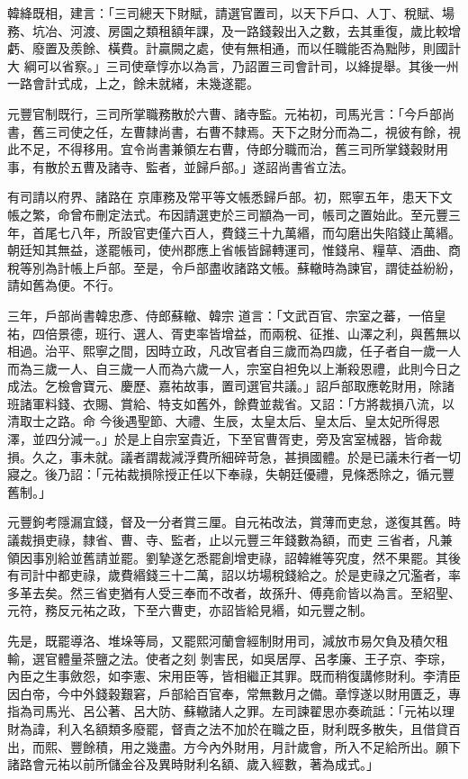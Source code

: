 \begin{pinyinscope}
 韓絳既相，建言：「三司總天下財賦，請選官置司，以天下戶口、人丁、稅賦、場務、坑冶、河渡、房園之類租額年課，及一路錢穀出入之數，去其重復，歲比較增虧、廢置及羨餘、橫費。計贏闕之處，使有無相通，而以任職能否為黜陟，則國計大
 綱可以省察。」三司使章惇亦以為言，乃詔置三司會計司，以絳提舉。其後一州一路會計式成，上之，餘未就緒，未幾遂罷。



 元豐官制既行，三司所掌職務散於六曹、諸寺監。元祐初，司馬光言：「今戶部尚書，舊三司使之任，左曹隸尚書，右曹不隸焉。天下之財分而為二，視彼有餘，視此不足，不得移用。宜令尚書兼領左右曹，侍郎分職而治，舊三司所掌錢穀財用事，有散於五曹及諸寺、監者，並歸戶部。」遂詔尚書省立法。



 有司請以府界、諸路在
 京庫務及常平等文帳悉歸戶部。初，熙寧五年，患天下文帳之繁，命曾布刪定法式。布因請選吏於三司顓為一司，帳司之置始此。至元豐三年，首尾七八年，所設官吏僅六百人，費錢三十九萬緡，而勾磨出失陷錢止萬緡。朝廷知其無益，遂罷帳司，使州郡應上省帳皆歸轉運司，惟錢帛、糧草、酒曲、商稅等別為計帳上戶部。至是，令戶部盡收諸路文帳。蘇轍時為諫官，謂徒益紛紛，請如舊為便。不行。



 三年，戶部尚書韓忠彥、侍郎蘇轍、韓宗
 道言：「文武百官、宗室之蕃，一倍皇祐，四倍景德，班行、選人、胥吏率皆增益，而兩稅、征推、山澤之利，與舊無以相過。治平、熙寧之間，因時立政，凡改官者自三歲而為四歲，任子者自一歲一人而為三歲一人、自三歲一人而為六歲一人，宗室自袒免以上漸殺恩禮，此則今日之成法。乞檢會寶元、慶歷、嘉祐故事，置司選官共議。」詔戶部取應乾財用，除諸班諸軍料錢、衣賜、賞給、特支如舊外，餘費並裁省。又詔：「方將裁損八流，以清取士之路。命
 今後遇聖節、大禮、生辰，太皇太后、皇太后、皇太妃所得恩澤，並四分減一。」於是上自宗室貴近，下至官曹胥吏，旁及宮室械器，皆命裁損。久之，事未就。議者謂裁減浮費所細碎苛急，甚損國體。於是已議未行者一切寢之。後乃詔：「元祐裁損除授正任以下奉祿，失朝廷優禮，見條悉除之，循元豐舊制。」



 元豐鉤考隱漏宜錢，督及一分者賞三厘。自元祐改法，賞薄而吏怠，遂復其舊。時議裁損吏祿，隸省、曹、寺、監者，止以元豐三年錢數為額，而吏
 三省者，凡兼領因事別給並舊請並罷。劉摯遂乞悉罷創增吏祿，詔韓維等究度，然不果罷。其後有司計中都吏祿，歲費緡錢三十二萬，詔以坊場稅錢給之。於是吏祿之冗濫者，率多革去矣。然三省吏猶有人受三奉而不改者，故孫升、傅堯俞皆以為言。至紹聖、元符，務反元祐之政，下至六曹吏，亦詔皆給見緡，如元豐之制。



 先是，既罷導洛、堆垛等局，又罷熙河蘭會經制財用司，減放市易欠負及積欠租輸，選官體量茶鹽之法。使者之刻
 剝害民，如吳居厚、呂孝廉、王子京、李琮，內臣之生事斂怨，如李憲、宋用臣等，皆相繼正其罪。既而稍復講修財利。李清臣因白帝，今中外錢穀艱窘，戶部給百官奉，常無數月之備。章惇遂以財用匱乏，專指為司馬光、呂公著、呂大防、蘇轍諸人之罪。左司諫翟思亦奏疏詆：「元祐以理財為諱，利入名額類多廢罷，督責之法不加於在職之臣，財利既多散失，且借貸百出，而熙、豐餘積，用之幾盡。方今內外財用，月計歲會，所入不足給所出。願下
 諸路會元祐以前所儲金谷及異時財利名額、歲入經數，著為成式。」




\end{pinyinscope}
